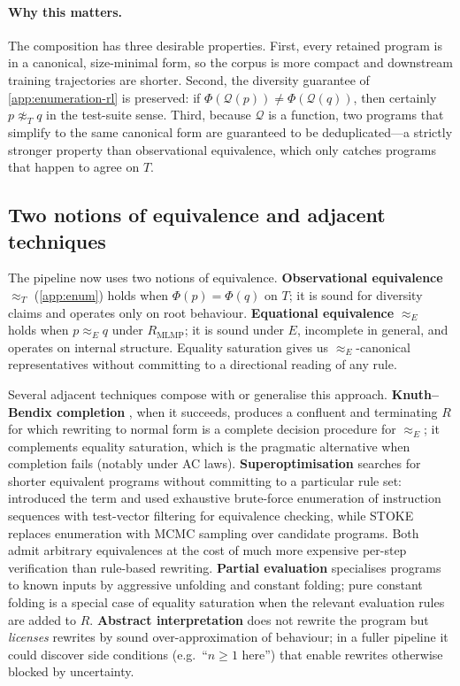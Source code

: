 \documentclass[12pt]{article}
\begin{document}
\paragraph{Why this matters.} The composition has three desirable properties. First, every retained program is in a canonical, size-minimal form, so the corpus is more compact and downstream training trajectories are shorter. Second, the diversity guarantee of \cref{app:enumeration-rl} is preserved: if $\Phi(\mathcal{Q}(p)) \neq \Phi(\mathcal{Q}(q))$, then certainly $p \not\approx_T q$ in the test-suite sense. Third, because $\mathcal{Q}$ is a function, two programs that simplify to the same canonical form are guaranteed to be deduplicated---a strictly stronger property than observational equivalence, which only catches programs that happen to agree on $T$.

\subsection{Two notions of equivalence and adjacent techniques}\label{app:simp-adjacent}

The pipeline now uses two notions of equivalence. \textbf{Observational equivalence} $\approx_T$ (\cref{app:enum}) holds when $\Phi(p) = \Phi(q)$ on $T$; it is sound for diversity claims and operates only on root behaviour. \textbf{Equational equivalence} $\approx_E$ holds when $p \approx_E q$ under $R_{\text{MLMP}}$; it is sound under $E$, incomplete in general, and operates on internal structure. Equality saturation gives us $\approx_E$-canonical representatives without committing to a directional reading of any rule.

Several adjacent techniques compose with or generalise this approach. \textbf{Knuth--Bendix completion} \citep{knuth1970simple}, when it succeeds, produces a confluent and terminating $R$ for which rewriting to normal form is a complete decision procedure for $\approx_E$; it complements equality saturation, which is the pragmatic alternative when completion fails (notably under AC laws). \textbf{Superoptimisation} searches for shorter equivalent programs without committing to a particular rule set: \citet{massalin1987superoptimizer} introduced the term and used exhaustive brute-force enumeration of instruction sequences with test-vector filtering for equivalence checking, while STOKE \citep{schkufza2013stoke} replaces enumeration with MCMC sampling over candidate programs. Both admit arbitrary equivalences at the cost of much more expensive per-step verification than rule-based rewriting. \textbf{Partial evaluation} \citep{jones1993partial} specialises programs to known inputs by aggressive unfolding and constant folding; pure constant folding is a special case of equality saturation when the relevant evaluation rules are added to $R$. \textbf{Abstract interpretation} \citep{cousot1977abstract} does not rewrite the program but \emph{licenses} rewrites by sound over-approximation of behaviour; in a fuller pipeline it could discover side conditions (e.g.\ ``$n \geq 1$ here'') that enable rewrites otherwise blocked by uncertainty.
\end{document}
